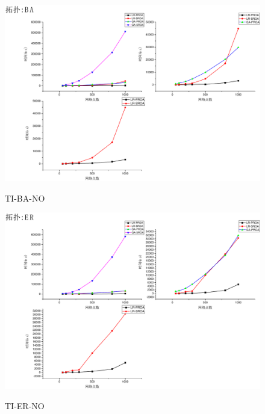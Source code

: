 \begin{figure}
\setlength{\belowcaptionskip}{-0.1cm}
  \begin{center}
    {\includegraphics[width=1 \textwidth]{figures/TI-BA-NO.pdf}}
    \end{center}
  \caption{{\footnotesize{TI-BA-NO}}}
  \label{TI-BA-NO}
\end{figure}
\begin{figure}
\setlength{\belowcaptionskip}{-0.1cm}
  \begin{center}
    {\includegraphics[width=1 \textwidth]{figures/TI-ER-NO.pdf}}
    \end{center}
  \caption{{\footnotesize{TI-ER-NO}}}
  \label{TI-ER-NO}
\end{figure}
